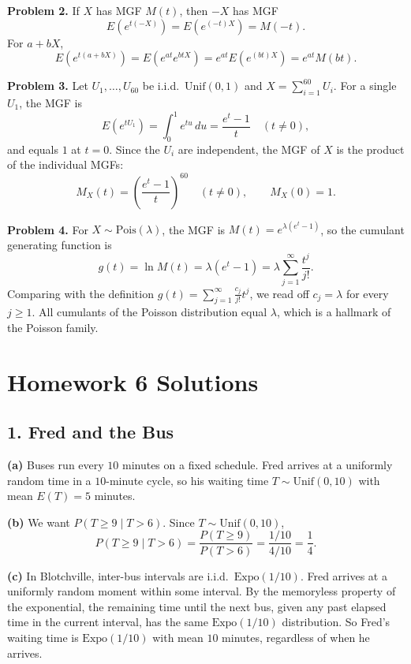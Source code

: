 \documentclass{article}
\begin{document}
\bigskip
\textbf{Problem 2.} If $X$ has MGF $M(t)$, then $-X$ has MGF
$$
E(e^{t(-X)}) = E(e^{(-t)X}) = M(-t).
$$
For $a + bX$,
$$
E(e^{t(a+bX)}) = E(e^{at}e^{btX}) = e^{at}E(e^{(bt)X}) = e^{at}M(bt).
$$

\bigskip
\textbf{Problem 3.} Let $U_1, \dots, U_{60}$ be i.i.d.\ $\text{Unif}(0,1)$ and $X = \sum_{i=1}^{60} U_i$. For a single $U_1$, the MGF is
$$
E(e^{tU_1}) = \int_0^1 e^{tu}\,du = \frac{e^t - 1}{t} \quad (t \ne 0),
$$
and equals $1$ at $t=0$. Since the $U_i$ are independent, the MGF of $X$ is the product of the individual MGFs:
$$
M_X(t) = \left(\frac{e^t - 1}{t}\right)^{60} \quad (t \ne 0), \qquad M_X(0) = 1.
$$

\bigskip
\textbf{Problem 4.} For $X \sim \text{Pois}(\lambda)$, the MGF is $M(t) = e^{\lambda(e^t - 1)}$, so the cumulant generating function is
$$
g(t) = \ln M(t) = \lambda(e^t - 1) = \lambda\sum_{j=1}^{\infty}\frac{t^j}{j!}.
$$
Comparing with the definition $g(t) = \sum_{j=1}^{\infty}\frac{c_j}{j!}t^j$, we read off $c_j = \lambda$ for every $j \ge 1$. All cumulants of the Poisson distribution equal $\lambda$, which is a hallmark of the Poisson family.

\bigskip
\section*{Homework 6 Solutions}

\subsection*{1. Fred and the Bus}

\textbf{(a)} Buses run every $10$ minutes on a fixed schedule. Fred arrives at a uniformly random time in a $10$-minute cycle, so his waiting time $T \sim \text{Unif}(0, 10)$ with mean $E(T) = 5$ minutes.

\textbf{(b)} We want $P(T \ge 9 \mid T > 6)$. Since $T \sim \text{Unif}(0,10)$,
$$
P(T \ge 9 \mid T > 6) = \frac{P(T \ge 9)}{P(T > 6)} = \frac{1/10}{4/10} = \frac{1}{4}.
$$

\textbf{(c)} In Blotchville, inter-bus intervals are i.i.d.\ $\text{Expo}(1/10)$. Fred arrives at a uniformly random moment within some interval. By the memoryless property of the exponential, the remaining time until the next bus, given any past elapsed time in the current interval, has the same $\text{Expo}(1/10)$ distribution. So Fred's waiting time is $\text{Expo}(1/10)$ with mean $10$ minutes, regardless of when he arrives.
\end{document}
